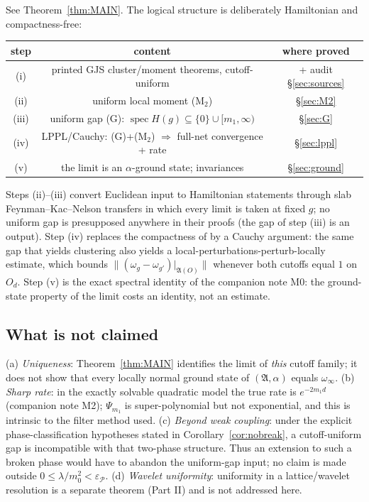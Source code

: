 \documentclass[11pt,a4paper]{article}
\theoremstyle{plain}
\theoremstyle{definition}
\newcommand{\A}{\mathfrak{A}}
\DeclareMathOperator{\spec}{spec}
\begin{document}
See Theorem~\ref{thm:MAIN}. The logical structure is deliberately Hamiltonian and
compactness-free:

\begin{center}
\begin{tabular}{ccc}
\toprule
step & content & where proved\\
\midrule
(i) & printed GJS cluster/moment theorems, cutoff-uniform & \cite{GJS} + audit \S\ref{sec:sources}\\
(ii) & uniform local moment (M$_2$) & \S\ref{sec:M2}\\
(iii) & uniform gap (G): $\spec H(g)\subseteq\{0\}\cup[m_1,\infty)$ & \S\ref{sec:G}\\
(iv) & LPPL/Cauchy: (G)+(M$_2$) $\Rightarrow$ full-net convergence + rate & \S\ref{sec:lppl}\\
(v) & the limit is an $\alpha$-ground state; invariances & \S\ref{sec:ground}\\
\bottomrule
\end{tabular}
\end{center}

Steps (ii)--(iii) convert Euclidean input to Hamiltonian statements through slab
Feynman--Kac--Nelson transfers in which every limit is taken at fixed $g$; no uniform gap is
presupposed anywhere in their proofs (the gap of step (iii) is an output). Step (iv) replaces
the compactness of \cite{GJ3} by a Cauchy argument: the same gap that yields clustering also
yields a local-perturbations-perturb-locally estimate, which bounds
$\|(\omega_g-\omega_{g'})|_{\A(O)}\|$ whenever both cutoffs equal $1$ on $O_d$. Step (v) is the
exact spectral identity of the companion note M0: the ground-state property of the limit costs
an identity, not an estimate.

\subsection{What is not claimed}

(a) \emph{Uniqueness}: Theorem~\ref{thm:MAIN} identifies the limit of \emph{this} cutoff family;
it does not show that every locally normal ground state of $(\A,\alpha)$ equals $\omega_\infty$.
(b) \emph{Sharp rate}: in the exactly solvable quadratic model the true rate is
$e^{-2m_1d}$ (companion note M2); $\Psi_{m_1}$ is super-polynomial but not exponential, and this
is intrinsic to the filter method used. (c) \emph{Beyond weak coupling}: under the explicit
phase-classification hypotheses stated in Corollary~\ref{cor:nobreak}, a cutoff-uniform gap is
incompatible with that two-phase structure. Thus an extension to such a broken phase would have
to abandon the uniform-gap input; no claim is made outside
$0\le\lambda/m_0^2<\varepsilon_{\mathscr P}$. (d) \emph{Wavelet uniformity}: uniformity in a
lattice/wavelet resolution is a separate theorem (Part II) and is not addressed here.
\end{document}
